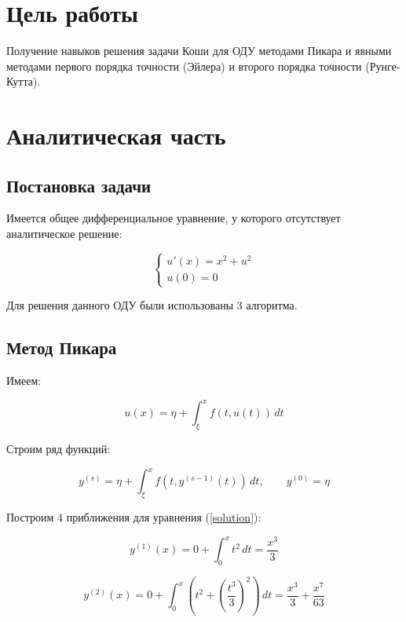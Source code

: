 \chapter*{Цель работы}
Получение навыков решения задачи Коши для ОДУ методами Пикара и
явными методами первого порядка точности (Эйлера) и второго порядка точности (Рунге-Кутта).

\chapter*{Аналитическая часть}

\section*{Постановка задачи}

Имеется общее дифференциальное уравнение, у которого отсутствует аналитическое решение:

\begin{equation}
\label{initial_odu}
\begin{cases}
u'(x) = x^2 + u^2\\
u(0) = 0
\end{cases}
\end{equation}\newline

Для решения данного ОДУ были использованы 3 алгоритма.

\section*{Метод Пикара}

Имеем:

\begin{equation}
\label{solution}
u(x) = \eta +  \int_{\xi}^{x} f(t,u(t)) \,dt
\end{equation}

Строим ряд функций:

\begin{equation}
\label{sol}
y^{(s)} = \eta +  \int_{\xi}^{x} f(t,y^{(s-1)}(t)) \,dt, \quad \quad
y^{(0)} = \eta
\end{equation}

Построим 4 приближения для уравнения (\ref{solution}):

\begin{equation}
\label{f1}
y^{(1)}(x) = 0 + \int_{0}^{x} t^2 \,dt = \frac{x^3}{3}
\end{equation}

\begin{equation}
\label{f2}
y^{(2)}(x) = 0 + \int_{0}^{x} (t^2 + \left(\frac{t^3}{3}\right)^2) \,dt = \frac{x^3}{3} + \frac{x^7}{63}
\end{equation}

